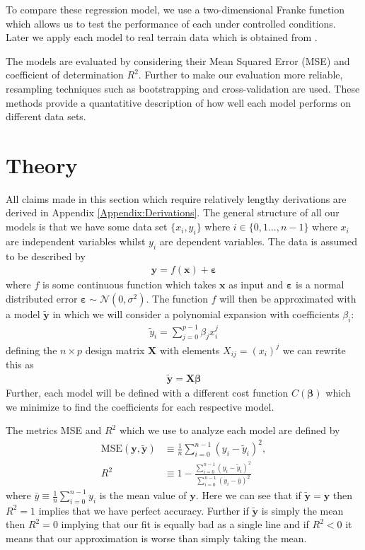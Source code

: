 \documentclass[%
reprint,
amsmath,amssymb,
aps,
pra,
]{revtex4-2}
\begin{document}
To compare these regression model, we use a two-dimensional Franke function which allows us to test the performance of each under controlled conditions. Later we apply each model to real terrain data which is obtained from \cite{USGS_EarthExplorer}.

The models are evaluated by considering their Mean Squared Error (MSE) and coefficient of determination $R^2$. Further to make our evaluation more reliable, resampling techniques such as bootstrapping and cross-validation are used. These methods provide a quantatitive description of how well each model performs on different data sets.
\section{Theory}
All claims made in this section which require relatively lengthy derivations are derived in Appendix \ref{Appendix:Derivations}. The general structure of all our models is that we have some data set $\{x_i,y_i\}$ where $i\in\{0,1...,n-1\}$ where $x_i$ are independent variables whilst $y_i$ are dependent variables. The data is assumed to be described by
\begin{align}
	\bm y=f(\bm x)+\bm \varepsilon
	\label{eq:data}
\end{align}
where $f$ is some continuous function which takes $\bm x$ as input and $\bm\varepsilon$ is a normal distributed error $\bm\varepsilon\sim\mathcal{N}(0,\sigma^2)$. The function $f$ will then be approximated with a model $\tilde{\bm y}$ in which we will consider a polynomial expansion with coefficients $\beta_i$:
\begin{align}
	\tilde{y}_i=\sum_{j=0}^{p-1}\beta_j x_i^j
	\label{eq:model}
\end{align}
defining the $n\times p$ design matrix $\bm X$ with elements $X_{ij}=(x_i)^j$ we can rewrite this as
\begin{align}
	\tilde{\bm y}=\bm X\bm\beta
\end{align}
Further, each model will be defined with a different cost function $C(\bm\beta)$ which we minimize to find the coefficients for each respective model.

The metrics MSE and $R^2$ which we use to analyze each model are defined by
\begin{align}
	\text{MSE}(\bm y,\tilde{\bm{y}})&\equiv\frac{1}{n}\sum_{i=0}^{n-1}(y_i-\tilde y_i)^2,\\
	R^2&\equiv1-\frac{\sum_{i=0}^{n-1}(y_i-\tilde y_i)^2}{\sum_{i=0}^{n-1}(y_i-\bar y)^2}
\end{align}
where $\bar y\equiv\frac{1}{n}\sum_{i=0}^{n-1}y_i$ is the mean value of $\bm y$. Here we can see that if $\tilde{\bm{y}}=\bm y$ then $R^2=1$ implies that we have perfect accuracy. Further if $\tilde{\bm{y}}$ is simply the mean then $R^2=0$ implying that our fit is equally bad as a single line and if $R^2<0$ it means that our approximation is worse than simply taking the mean.
\end{document}
